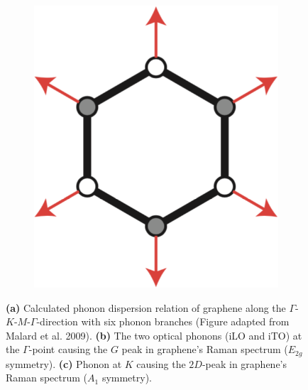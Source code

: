 \begin{figure}[!h]
\begin{subfigure}{0.25\textwidth}
    \includegraphics[width=\textwidth]{./images/2d-mode-phonon.png}
  \end{subfigure}
  \caption{\textbf{(a)} Calculated phonon dispersion relation of graphene along the $\Gamma$-$K$-$M$-$\Gamma$-direction with six phonon branches (Figure adapted from Malard et al. 2009\mcite). \textbf{(b)} The two optical phonons (iLO and iTO) at the $\Gamma$-point causing the $G$ peak in graphene's Raman spectrum ($E_{2g}$ symmetry). \textbf{(c)} Phonon at $K$ causing the $2D$-peak in graphene's Raman spectrum ($A_1$ symmetry).}
  \label{fig:phonons}
\end{figure}

\newpage

